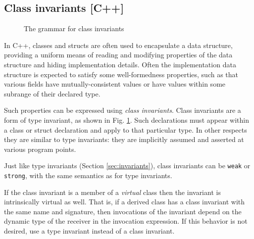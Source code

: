 \subsection{Class invariants [C++]}

\begin{figure}[t]
\begin{cadre}

\end{cadre}
\caption{The grammar for class invariants}
\label{fig:gram:classinvariant}
\end{figure}

In C++, classes and structs are often used to encapsulate a data structure, 
providing a uniform means of reading and modifying properties of the data
structure and hiding implementation details. Often the implementation
data structure is expected to satisfy some well-formedness properties, such as
that various fields have mutually-consistent values or have values within
some subrange of their declared type.

Such properties can be expressed using \textit{class invariants}. Class invariants
are a form of type invariant, as shown in Fig. \ref{fig:gram:classinvariant}.
Such declarations must appear within a class or struct declaration and 
apply to that particular type. In other respects they are similar to 
type invariants: they are implicitly assumed and asserted at various
program points.

Just like type invariants (Section \ref{sec:invariants}), class invariants can be \lstinline|weak| or \lstinline|strong|, with the same semantics as for type invariants.

If the class invariant is a member of a \textit{virtual} class then the invariant is intrinsically virtual as well. That is, if a derived class has a class invariant with the same
name and signature, then invocations of the invariant depend on the dynamic type of the receiver in the invocation expression. If this behavior is not desired, use a type invariant
instead of a class invariant.
